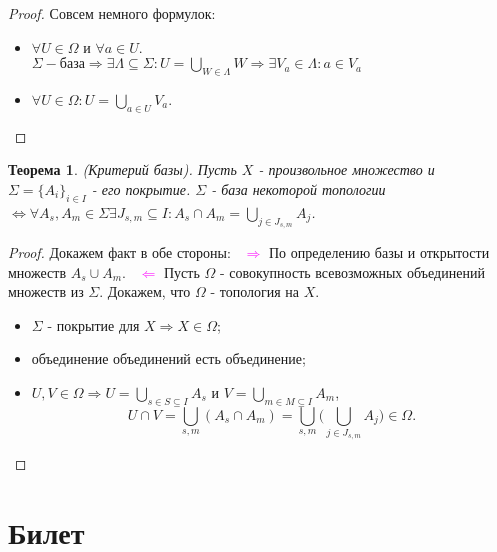 \documentclass[a4paper,100pt]{article}
\theoremstyle{indented}
\newtheorem{theorem}{Теорема}
\begin{document}
\begin{proof} Совсем немного формулок: \

    \begin{itemize}
        \item $\forall U\in \Omega$ и $\forall a\in U$. \\
        $\Sigma - \text{база} \Rightarrow \exists \Lambda \subseteq \Sigma : U = \bigcup _{W\in \Lambda}W \Rightarrow \exists V_a \in \Lambda : a\in V_a$
        \item $\forall U \in \Omega : U = \bigcup_{a\in U}V_a$.
    \end{itemize}
\end{proof}

\begin{theorem}
    (Критерий базы). Пусть $X$ - произвольное множество и $\Sigma = \{ A_i \}_{i\in I}$ - его покрытие. $\Sigma$ - база некоторой топологии $\Longleftrightarrow \forall A_s, A_m \in \Sigma \exists J_{s, m}\subseteq I:A_s\cap A_m = \bigcup_{j\in J_{s, m}}A_j$.
\end{theorem}   

\begin{proof}
    Докажем факт в обе стороны: \ 
    \textcolor{magenta}{$\Rightarrow$} По определению базы и открытости множеств $A_s \cup A_m$. \ 
    \textcolor{magenta}{$\Leftarrow$} Пусть $\Omega$ - совокупность всевозможных объединений множеств из $\Sigma$. Докажем, что $\Omega $ - топология на $X$. \
    \begin{itemize}
        \item $\Sigma$ - покрытие для $X \Rightarrow X \in \Omega$;
        \item объединение объединений есть объединение;
        \item $U, V \in \Omega \Rightarrow U = \bigcup_{s\in S\subseteq I}A_s $ и $V = \bigcup_{m\in M\subseteq I} A_m$, 
        \[
            U\cap V = \bigcup_{s,m}(A_s\cap A_m) = \bigcup_{s,m}\biggl( \bigcup_{j\in J_{s,m}}A_j\biggr)\in \Omega.
        \]
    \end{itemize}

\end{proof}    

\section{Билет} \
\end{document}
